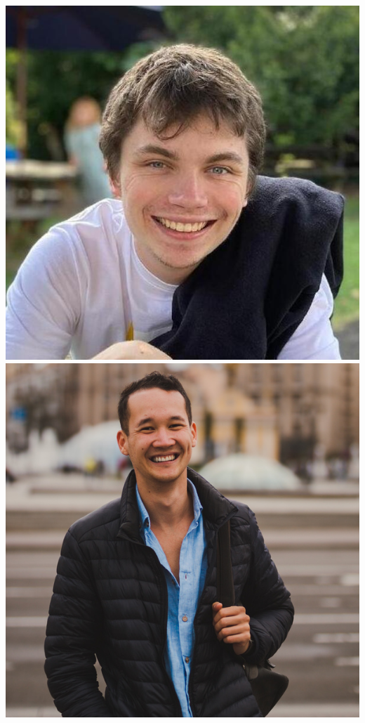 \documentclass[aspectratio=169]{beamer}
\begin{document}
\begin{frame}
{        \includegraphics[width=0.09\textheight]{figures/students/harry_bevins.jpg}%
        \includegraphics[width=0.09\textheight]{figures/students/kilian_scheutwinkel.jpg}%
}
\end{frame}
\end{document}
